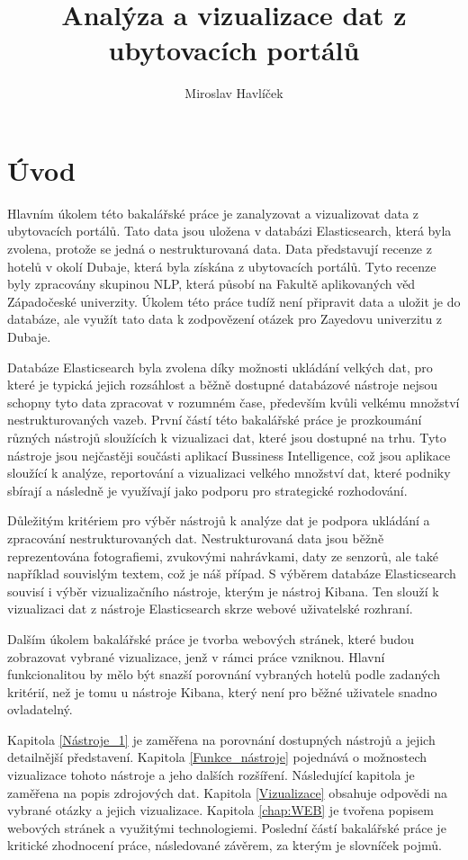 \documentclass[czech,BP]{thesiskiv}
\author{Miroslav Havlíček}
\title{Analýza a vizualizace dat z ubytovacích portálů}
\begin{document}
%
\maketitle
\tableofcontents
\chapter{Úvod}
Hlavním úkolem této bakalářské práce je zanalyzovat a vizualizovat data z ubytovacích portálů. Tato data jsou uložena v databázi Elasticsearch, která byla zvolena, protože se jedná o nestrukturovaná data. Data představují recenze z hotelů v okolí Dubaje, která byla získána z ubytovacích portálů. Tyto recenze byly zpracovány skupinou NLP, která působí na Fakultě aplikovaných věd Západočeské univerzity. Úkolem této práce tudíž není připravit data a uložit je do databáze, ale využít tato data k zodpovězení otázek pro Zayedovu univerzitu z Dubaje.


Databáze Elasticsearch byla zvolena díky možnosti ukládání velkých dat, pro které je typická jejich rozsáhlost a běžně dostupné databázové nástroje nejsou schopny tyto data zpracovat v rozumném čase, především kvůli velkému množství nestrukturovaných vazeb.\cite{BigData} První částí této bakalářské práce je prozkoumání různých nástrojů sloužících k vizualizaci dat, které jsou dostupné na trhu. Tyto nástroje jsou nejčastěji součásti aplikací Bussiness Intelligence, což jsou aplikace sloužící k analýze, reportování a vizualizaci velkého množství dat, které podniky sbírají a následně je využívají jako podporu pro strategické rozhodování. 


Důležitým kritériem pro výběr nástrojů k analýze dat je podpora ukládání a zpracování nestrukturovaných dat. Nestrukturovaná data jsou běžně reprezentována fotografiemi, zvukovými nahrávkami, daty ze senzorů, ale také například  souvislým textem, což je náš případ. S výběrem databáze Elasticsearch souvisí i výběr vizualizačního nástroje, kterým je nástroj Kibana. Ten slouží k vizualizaci dat z nástroje Elasticsearch skrze webové uživatelské rozhraní.


Dalším úkolem bakalářské práce je tvorba webových stránek, které budou zobrazovat vybrané vizualizace, jenž v rámci práce vzniknou. Hlavní funkcionalitou by mělo být snazší porovnání vybraných hotelů podle zadaných kritérií, než je tomu u nástroje Kibana, který není pro běžné uživatele snadno ovladatelný.


Kapitola \ref{Nástroje_1} je zaměřena na porovnání dostupných nástrojů a jejich detailnější představení. Kapitola \ref{Funkce_nástroje} pojednává o možnostech vizualizace tohoto nástroje a jeho dalších rozšíření. Následující kapitola je zaměřena na popis zdrojových dat. Kapitola \ref{Vizualizace} obsahuje odpovědi na vybrané otázky a jejich vizualizace. Kapitola \ref{chap:WEB} je tvořena popisem webových stránek a využitými technologiemi. Poslední částí bakalářské práce je kritické zhodnocení práce, následované závěrem, za kterým je slovníček pojmů.
\end{document}
